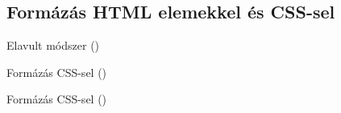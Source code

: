 \subsection{Formázás HTML elemekkel és CSS-sel}

\begin{frame}
  \small
  \begin{alertblock}{Elavult módszer ()}
    
  \end{alertblock}
\end{frame}

\begin{frame}
  \scriptsize
  \begin{exampleblock}{Formázás CSS-sel ()}
    
  \end{exampleblock}
  \begin{exampleblock}{Formázás CSS-sel ()}
    
  \end{exampleblock}
\end{frame}
